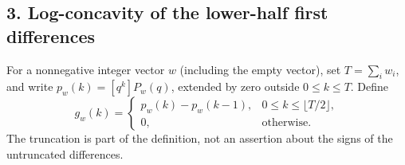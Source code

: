 \documentclass[11pt]{article}
\begin{document}
\subsection*{3. Log-concavity of the lower-half first differences}
For a nonnegative integer vector $w$ (including the empty vector), set
$T=\sum_iw_i$, and write $p_w(k)=[q^k]P_w(q)$, extended by zero outside
$0\le k\le T$. Define
\begin{equation}\label{eq:gdef}
 g_w(k)=
 \begin{cases}
 p_w(k)-p_w(k-1),&0\le k\le\lfloor T/2\rfloor,\\
 0,&\text{otherwise}.
 \end{cases}
\end{equation}
The truncation is part of the definition, not an assertion about the
signs of the untruncated differences.
\end{document}

